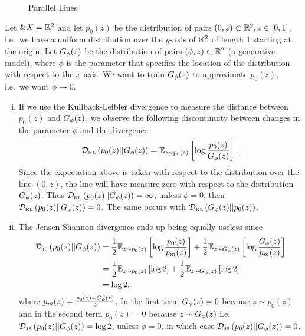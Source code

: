 \begin{example}
  \begin{figure}[h]
    \centering
    \caption{Parallel Lines}%
    \label{fig:parallel-lines}
  \end{figure}%
  \label{example:learning-parallel-lines}

  Let $\&X = \mathbb{R}^2$ and let $p_0(z)$ be the distribution of pairs
  $(0, z) \subset \mathbb{R}^2, z \in [0, 1]$, i.e.\ we have a uniform
  distribution over the $y$-axis of $\mathbb{R}^2$ of length 1 starting at the
  origin. Let $G_\phi(z)$ be the distribution of pairs
  $(\phi, z) \subset \mathbb{R}^2$ (a generative model), where $\phi$ is the
  parameter that specifies the location of the distribution with
  respect to the $x$-axis. We want to train $G_\phi(z)$ to approximate
  $p_0(z)$, i.e.\ we want $\phi \to 0$.
  \begin{enumerate}[(i)]
    \item If we use the Kullback-Leibler divergence to measure the
      distance between $p_0(z)$ and $G_\phi(z)$, we observe the following
      discontinuity between changes in the parameter $\phi$ and the
      divergence
    \begin{align}
      \mathcal{D}_{\text{\tiny KL}}\left( p_0(z) \middle| \middle| G_\phi(z) \right) = \mathbb{E}_{z \sim p_0(z)}\left[ \log{p_0(z)\over G_\phi(z)} \right].
    \end{align}
      Since the expectation above is taken with respect to the
      distribution over the line $(0, z)$, the line will have measure
      zero with respect to the distribution $G_\phi(z)$. Thus
      $\mathcal{D}_{\text{\tiny KL}}\left( p_0(z) \middle| \middle| G_\phi(z) \right) = \infty$, unless $\phi = 0$, then
      $\mathcal{D}_{\text{\tiny KL}}\left( p_0(z) \middle| \middle| G_\phi(z) \right) = 0$. The same occurs with
      $\mathcal{D}_{\text{\tiny KL}}\left( G_\phi(z) \middle| \middle| p_0(z) \right)$.
  \item The Jensen-Shannon divergence ends up being equally useless
    since
    \begin{align}
      \mathcal{D}_{\text{\tiny JS}}\left(p_0(z)\middle|\middle|G_\phi(z)\right) & = {1 \over 2} \mathbb{E}_{z \sim p_0(z)}\left[ \log{p_0(z)
                            \over p_m(z)} \right] + {1 \over 2} \mathbb{E}_{z \sim
                            G_\phi(z)}\left[ \log{G_\phi(z) \over p_m(z)} \right] \\
                          & = {1 \over 2} \mathbb{E}_{z \sim p_0(z)}\left[ \log{2} \right] + {1
                            \over 2} \mathbb{E}_{z \sim G_\phi(z)}\left[ \log{2} \right] \\
                          & = \log{2},
    \end{align}
      where $p_m(z) = {p_0(z) + G_\phi(z) \over 2}$. In the first term
      $G_\phi(z) = 0$ because $z \sim p_0(z)$ and in the second term
      $p_0(z) = 0$ because $z \sim G_\phi(z)$ i.e.
      $\mathcal{D}_{\text{\tiny JS}}\left(p_0(z)\middle|\middle|G_\phi(z)\right) = \log{2}$, unless $\phi = 0$, in which case
      $\mathcal{D}_{\text{\tiny JS}}\left(p_0(z)\middle|\middle|G_\phi(z)\right) = 0$.
  \end{enumerate}
\end{example}

